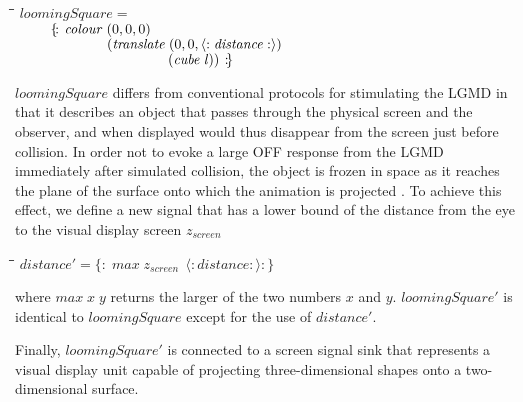 \documentclass[11pt]{article}
\newlength{\lwidth}\setlength{\lwidth}{4.5cm}
\newlength{\cwidth}\setlength{\cwidth}{8mm} %
\newcommand{\Varid}[1]{\mathit{#1}}
\begin{document}
\begin{tabbing}
\qquad\=\hspace{\lwidth}\=\hspace{\cwidth}\=\+\kill
${\Varid{loomingSquare}\mathrel{=}}$\\
${\hskip2.50em\relax\{\!:\!\;\Varid{colour}\;(\mathrm{0},\mathrm{0},\mathrm{0})\;}$\\
${\hskip2.50em\relax\phantom{\{\!:\!\;\Varid{colour}\;\mbox{}}(\Varid{translate}\;(\mathrm{0},\mathrm{0},\langle:\Varid{distance}:\rangle)\;}$\\
${\hskip2.50em\relax\phantom{\{\!:\!\;\Varid{colour}\;\mbox{}}\phantom{(\Varid{translate}\;\mbox{}}(\Varid{cube}\;\Varid{l}))\;\!:\!\}}$
\end{tabbing}
\ensuremath{\Varid{loomingSquare}} differs from conventional protocols
\cite{Gabbiani2001} for stimulating the LGMD in that it describes an
object that passes through the physical screen and the observer, and
when displayed would thus disappear from the screen just before
collision. In order not to evoke a large OFF response from the LGMD
\cite{O'shea1976} immediately after simulated collision, the object
is frozen in space as it reaches the plane of the surface onto which
the animation is projected \cite{Hatsopoulos1995}. To achieve this
effect, we define a new signal that has a lower bound of the distance
from the eye to the visual display screen \ensuremath{z_{screen}}
\begin{tabbing}
\qquad\=\hspace{\lwidth}\=\hspace{\cwidth}\=\+\kill
${\Varid{distance'}\mathrel{=}\{\!:\!\;\Varid{max}\;z_{screen}\;\,\langle:\Varid{distance}:\rangle\!:\!\}}$
\end{tabbing}where \ensuremath{\Varid{max}\;\Varid{x}\;\Varid{y}} returns the larger of the two numbers \ensuremath{\Varid{x}} and
\ensuremath{\Varid{y}}. \ensuremath{\Varid{loomingSquare'}} is identical to \ensuremath{\Varid{loomingSquare}} except for the
use of \ensuremath{\Varid{distance'}}.

Finally, \ensuremath{\Varid{loomingSquare'}} is connected to a screen signal sink that
represents a visual display unit capable of projecting
three-dimensional shapes onto a two-dimensional surface.
\end{document}
